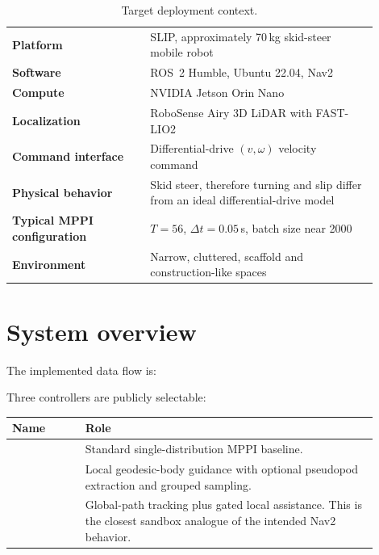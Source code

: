 \documentclass[11pt,a4paper]{article}
\newcommand{\code}[1]{\texttt{\detokenize{#1}}}
\begin{document}
\begin{table}[h]
\centering
\begin{tabular}{>{\bfseries}p{0.34\linewidth}p{0.56\linewidth}}
\toprule
Platform & SLIP, approximately 70\,kg skid-steer mobile robot \\
Software & ROS~2 Humble, Ubuntu 22.04, Nav2 \\
Compute & NVIDIA Jetson Orin Nano \\
Localization & RoboSense Airy 3D LiDAR with FAST-LIO2 \\
Command interface & Differential-drive $(v,\omega)$ velocity command \\
Physical behavior & Skid steer, therefore turning and slip differ from an
ideal differential-drive model \\
Typical MPPI configuration & $T=56$, $\Delta t=0.05$\,s, batch size near 2000 \\
Environment & Narrow, cluttered, scaffold and construction-like spaces \\
\bottomrule
\end{tabular}
\caption{Target deployment context.}
\end{table}

\section{System overview}

The implemented data flow is:

\begin{center}
\end{center}

Three controllers are publicly selectable:

\begin{table}[h]
\centering
\begin{tabular}{p{0.18\linewidth}p{0.72\linewidth}}
\toprule
\textbf{Name} & \textbf{Role} \\
\midrule
\code{vanilla} & Standard single-distribution MPPI baseline. \\
\code{local} & Local geodesic-body guidance with optional pseudopod extraction
and grouped sampling. \\
\code{hybrid} & Global-path tracking plus gated local assistance. This is the
closest sandbox analogue of the intended Nav2 behavior. \\
\bottomrule
\end{tabular}
\end{table}
\end{document}
